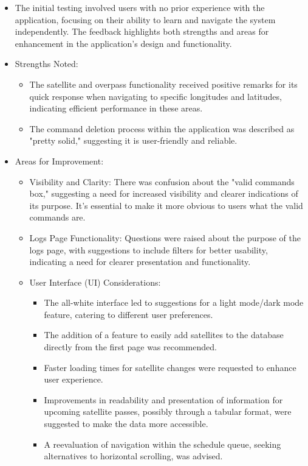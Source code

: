 \documentclass[12pt, titlepage]{article}
\begin{document}
\begin{itemize}
    \item The initial testing involved users with no prior experience with the application, focusing on their ability to learn and navigate the system independently. The feedback highlights both strengths and areas for enhancement in the application's design and functionality.
    \item Strengths Noted:
    \begin{itemize}
        \item The satellite and overpass functionality received positive remarks for its quick response when navigating to specific longitudes and latitudes, indicating efficient performance in these areas.
        \item The command deletion process within the application was described as "pretty solid," suggesting it is user-friendly and reliable.
    \end{itemize}
    \item Areas for Improvement:
    \begin{itemize}
        \item Visibility and Clarity: There was confusion about the "valid commands box," suggesting a need for increased visibility and clearer indications of its purpose. It's essential to make it more obvious to users what the valid commands are.
        \item Logs Page Functionality: Questions were raised about the purpose of the logs page, with suggestions to include filters for better usability, indicating a need for clearer presentation and functionality.
        \item User Interface (UI) Considerations:
        \begin{itemize}
            \item The all-white interface led to suggestions for a light mode/dark mode feature, catering to different user preferences.
            \item The addition of a feature to easily add satellites to the database directly from the first page was recommended.
            \item Faster loading times for satellite changes were requested to enhance user experience.
            \item Improvements in readability and presentation of information for upcoming satellite passes, possibly through a tabular format, were suggested to make the data more accessible.
            \item A reevaluation of navigation within the schedule queue, seeking alternatives to horizontal scrolling, was advised.

\end{itemize}
\end{itemize}
\end{itemize}
\end{document}
